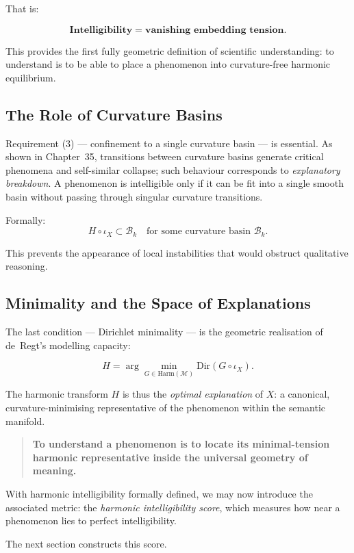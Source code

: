 That is:

\[
\textbf{Intelligibility} = \textbf{vanishing embedding tension}.
\]

This provides the first fully geometric definition of scientific
understanding:  
to understand is to be able to place a phenomenon into curvature-free harmonic
equilibrium.

\subsection*{The Role of Curvature Basins}

Requirement (3) — confinement to a single curvature basin — is essential.  
As shown in Chapter~35, transitions between curvature basins generate
critical phenomena and self-similar collapse; such behaviour corresponds to
\emph{explanatory breakdown}.  
A phenomenon is intelligible only if it can be fit into a single smooth basin
without passing through singular curvature transitions.

Formally:
\[
H\circ\iota_X \subset \mathcal{B}_k
\quad\text{for some curvature basin } \mathcal{B}_k.
\]

This prevents the appearance of local instabilities that would obstruct
qualitative reasoning.

\subsection*{Minimality and the Space of Explanations}

The last condition — Dirichlet minimality — is the geometric realisation of
de~Regt’s modelling capacity:

\[
H = \arg\min_{G\in\mathrm{Harm}(\mathcal{M})}
  \mathrm{Dir}(G\circ\iota_X).
\]

The harmonic transform $H$ is thus the \emph{optimal explanation} of $X$:
a canonical, curvature-minimising representative of the phenomenon within the
semantic manifold.

\begin{quote}
\textbf{To understand a phenomenon is to locate its minimal-tension harmonic
representative inside the universal geometry of meaning.}
\end{quote}

With harmonic intelligibility formally defined, we may now introduce the
associated metric: the \emph{harmonic intelligibility score}, which measures
how near a phenomenon lies to perfect intelligibility.

The next section constructs this score.

